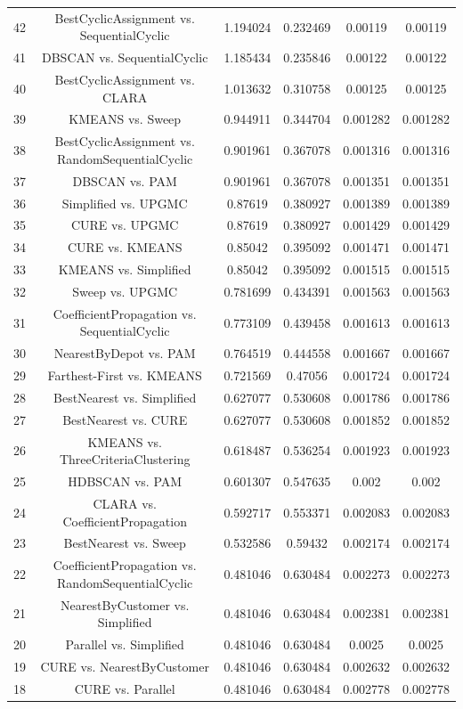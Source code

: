 \documentclass[a4paper,10pt]{article}
\begin{document}
\begin{landscape}
\begin{table}[!htp]
\begin{tabular}{cccccc}
42&BestCyclicAssignment vs. SequentialCyclic&1.194024&0.232469&0.00119&0.00119\\
41&DBSCAN vs. SequentialCyclic&1.185434&0.235846&0.00122&0.00122\\
40&BestCyclicAssignment vs. CLARA&1.013632&0.310758&0.00125&0.00125\\
39&KMEANS vs. Sweep&0.944911&0.344704&0.001282&0.001282\\
38&BestCyclicAssignment vs. RandomSequentialCyclic&0.901961&0.367078&0.001316&0.001316\\
37&DBSCAN vs. PAM&0.901961&0.367078&0.001351&0.001351\\
36&Simplified vs. UPGMC&0.87619&0.380927&0.001389&0.001389\\
35&CURE vs. UPGMC&0.87619&0.380927&0.001429&0.001429\\
34&CURE vs. KMEANS&0.85042&0.395092&0.001471&0.001471\\
33&KMEANS vs. Simplified&0.85042&0.395092&0.001515&0.001515\\
32&Sweep vs. UPGMC&0.781699&0.434391&0.001563&0.001563\\
31&CoefficientPropagation vs. SequentialCyclic&0.773109&0.439458&0.001613&0.001613\\
30&NearestByDepot vs. PAM&0.764519&0.444558&0.001667&0.001667\\
29&Farthest-First vs. KMEANS&0.721569&0.47056&0.001724&0.001724\\
28&BestNearest vs. Simplified&0.627077&0.530608&0.001786&0.001786\\
27&BestNearest vs. CURE&0.627077&0.530608&0.001852&0.001852\\
26&KMEANS vs. ThreeCriteriaClustering&0.618487&0.536254&0.001923&0.001923\\
25&HDBSCAN vs. PAM&0.601307&0.547635&0.002&0.002\\
24&CLARA vs. CoefficientPropagation&0.592717&0.553371&0.002083&0.002083\\
23&BestNearest vs. Sweep&0.532586&0.59432&0.002174&0.002174\\
22&CoefficientPropagation vs. RandomSequentialCyclic&0.481046&0.630484&0.002273&0.002273\\
21&NearestByCustomer vs. Simplified&0.481046&0.630484&0.002381&0.002381\\
20&Parallel vs. Simplified&0.481046&0.630484&0.0025&0.0025\\
19&CURE vs. NearestByCustomer&0.481046&0.630484&0.002632&0.002632\\
18&CURE vs. Parallel&0.481046&0.630484&0.002778&0.002778\\

\end{tabular}
\end{table}
\end{landscape}
\end{document}
